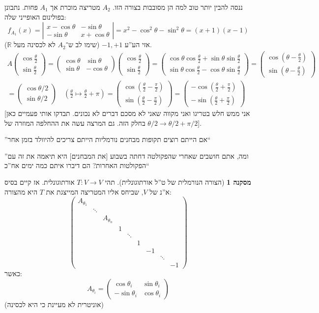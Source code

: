 \documentclass[a4paper]{article}
\newcommand\R     {\mathbb{R}}
\newcommand\ta    {\theta}
\newcommand\co        {\colon}
\newcommand\pms[1]    {\begin{pmatrix}
		#1
\end{pmatrix}}
\newcommand\sof[1]    {\left | #1 \right |}
\newcommand\cl [1]    {\left ( #1 \right )}
\theoremstyle{definition}
\newtheorem{Collary}{\color{mymagenta}מסקנה}
\begin{document}
	ננסה להבין יותר טוב למה הן מסובבות בצורה הזו. $A_2$ מטריצה מוכרת אך $A_1$ פחות. נתבונן בפולינום האופייני שלה: 
	\[ f_{A_1}(x) = \sof{\begin{matrix}
			x - \cos\ta & -\sin\ta \\ -\sin\ta & x + \cos\ta
	\end{matrix}} = x^2 - \cos^2 \ta - \sin^2\ta = (x + 1)(x - 1) \]
	אזי הע''ע $-1, +1$ (שימו לב ש־$A_2$ לא לכסינה מעל $\R$). 
	\begin{multline*}
		A\pms{\cos\frac{\ta}{2}\\\sin\frac{\ta}{2}} = \pms{\cos\ta & \sin\ta \\ \sin\ta & -\cos\ta} \pms{\cos\frac{\ta}{2} \\ \sin\frac{\ta}{2}} = \pms{\cos \ta \cos \frac{\ta}{2} + \sin\ta \sin\frac{\ta}{2} \\ \sin\ta\cos\frac{\ta}{2} - \cos\ta\sin\frac{\ta}{2}} = \pms{\cos\cl{\ta - \frac{\ta}{2}} \\ \sin\cl{\ta - \frac{\ta}{2}}} \\
		= \pms{\cos\ta/2 \\ \sin\ta/2} \quad \cl{\frac{\ta}{2} \mapsto \frac{\ta}{2} + \pi}
		= \pms{\cos\cl{\frac{\ta}{2} - \frac{\pi}{2}} \\ \sin\cl{\frac{\ta}{2} - \frac{\pi}{2}}} = \pms{-\cos\cl{\frac{\ta}{2} + \frac{\pi}{2}} \\ -\sin\cl{\frac{\ta}{2} + \frac{\pi}{2}}} 
	\end{multline*}
	[אני ממש חלש בטריגו ואני מקווה שאני לא מסכם דברים לא נכונים. תבדקו אותי פעמיים כאן בחלק הזה. גם המרצה עשה את ההחלפה המוזרה של $\ta/2 \to \ta/2 + \pi/2$]. 
	
	''אם הייתם רוצים תקופות מבחנים נורמליות הייתם צריכים להיוולד בזמן אחר``
	
	''ומה, אתם חושבים שאחרי שהפקולטה דחתה בשבוע [את המבחנים] היא תיאמה את זה עם הפקולטות האחרות? הם דיברו איתם כמה ימים אח''כ``
	
	\begin{Collary}[הצורה הנורמלית של ט''ל אורתוגונלית]
		תהי $T \co V \to V$ אורתוגונלית. אז קיים בסיס א''נ של $V$, שביחס אליו המטריצה המייצגת את $T$ היא מהצורה: 
		\[ \pms{A_{\ta_1} \\ &\ddots \\ &&A_{\ta_n} \\ &&& 1 \\ &&&&\ddots \\ &&&&&1 \\ &&&&&&-1 \\ &&&&&&& \ddots \\ &&&&&&&&-1} \]
		כאשר: 
		\[ A_{\ta_i} = \pms{\cos \ta_i & \sin \ta_i \\ -\sin \ta_i & \cos \ta_i} \]
		(אוניטרית לא מעיינת כי היא לכסינה)
	\end{Collary}
	
\end{document}
